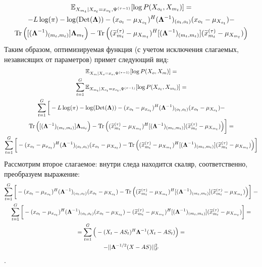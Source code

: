 \documentclass[11pt]{article}
\newcommand{\Expect}{\mathbb{E}}
\DeclareMathOperator{\Det}{Det}
\begin{document}
\begin{equation*}
\begin{gathered}
\Expect_{X_{m_t}|X_{o_t}=x_{o_t}, \Psi^{(\tau-1)}}[\log P(X_{o_t}, X_{m_t})]=\\
-L \log(\pi) - \log (\Det(\mathbf{\Lambda})) - (x_{o_t}-\mu_{X_{o_t}})^H (\mathbf{\Lambda}^{-1})_{(o_t, o_t)}(x_{o_t}-\mu_{X_{o_t}}) -  \\ \Tr \Big( [(\mathbf{\Lambda}^{-1})_{(m_t, m_t)}]\mathbf{\Lambda}_{m_t} \Big) - \Tr \Big((\widetilde{x}_{m_t}^{(\tau)} - \mu_{X_{m_t}})^H[(\mathbf{\Lambda}^{-1})_{(m_t, m_t)}](\widetilde{x}_{m_t}^{(\tau)} - \mu_{X_{m_t}}) \Big) 
\end{gathered}
\end{equation*}
Таким образом, оптимизируемая функция (с учетом исключения слагаемых, независящих от параметров) примет следующий вид:
\begin{equation*}
\begin{gathered}
 \Expect_{X_m|X_o=x_o, \Psi^{(\tau-1)}}[\log P(X_o, X_m)] = \\
 \sum_{t=1}^G\Expect_{X_{m_t}|X_{o_t}=x_{o_t}, \Psi^{(\tau-1)}}[\log P(X_{o_t}, X_{m_t})] = \\
\sum_{t=1}^G \bigg[ -L \log(\pi) - \log (\Det(\mathbf{\Lambda})) - (x_{o_t}-\mu_{x_{o_t}}) ^H (\mathbf{\Lambda}^{-1})_{(o_t, o_t)}(x_{o_t}-\mu_{X_{o_t}})  -  \\ \Tr \Big( [(\mathbf{\Lambda}^{-1})_{(m_t, m_t)}]\mathbf{\Lambda}_{m_t} \Big) - \Tr \Big((\widetilde{x}_{m_t}^{(\tau)} - \mu_{X_{m_t}})^H[(\mathbf{\Lambda}^{-1})_{(m_t, m_t)}](\widetilde{x}_{m_t}^{(\tau)} - \mu_{X_{m_t}}) \Big)  \bigg] =\\
\sum_{t=1}^G \bigg[- (x_{o_t}-\mu_{x_{o_t}}) ^H (\mathbf{\Lambda}^{-1})_{(o_t, o_t)}(x_{o_t}-\mu_{X_{o_t}})  - \Tr \Big((\widetilde{x}_{m_t}^{(\tau)} - \mu_{X_{m_t}})^H[(\mathbf{\Lambda}^{-1})_{(m_t, m_t)}](\widetilde{x}_{m_t}^{(\tau)} - \mu_{X_{m_t}}) \Big)  \bigg]
\end{gathered}
\end{equation*}
Рассмотрим второе слагаемое: внутри следа находится скаляр, соответственно, преобразуем выражение:
\clearpage
\begin{equation*}
\begin{gathered}
\sum_{t=1}^G \bigg[- (x_{o_t}-\mu_{x_{o_t}}) ^H (\mathbf{\Lambda}^{-1})_{(o_t, o_t)}(x_{o_t}-\mu_{X_{o_t}})  - \Tr \Big((\widetilde{x}_{m_t}^{(\tau)} - \mu_{X_{m_t}})^H[(\mathbf{\Lambda}^{-1})_{(m_t, m_t)}](\widetilde{x}_{m_t}^{(\tau)} - \mu_{X_{m_t}}) \Big)  \bigg] = \\
\sum_{t=1}^G \bigg[- (x_{o_t}-\mu_{x_{o_t}}) ^H (\mathbf{\Lambda}^{-1})_{(o_t, o_t)}(x_{o_t}-\mu_{X_{o_t}})  - (\widetilde{x}_{m_t}^{(\tau)} - \mu_{X_{m_t}})^H[(\mathbf{\Lambda}^{-1})_{(m_t, m_t)}](\widetilde{x}_{m_t}^{(\tau)} - \mu_{X_{m_t}})  \bigg] = \\
= \sum_{t=1}^G \Big( - (X_t-AS_t)^H \mathbf{\Lambda}^{-1}(X_t-AS_t) \Big) = \\
- ||\mathbf{\Lambda}^{-1/2}(X-AS)||_F^2
\end{gathered}
\end{equation*}.
\end{document}
